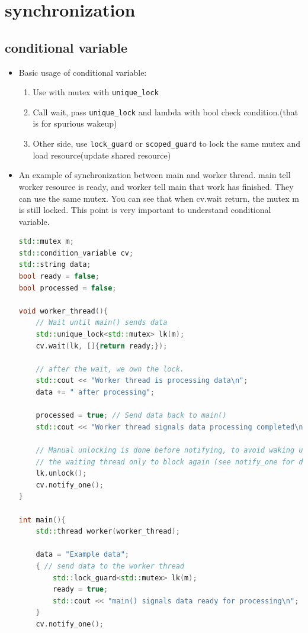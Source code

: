 \documentclass[a4paper,11pt,twoside]{book}
\begin{document}
\section{synchronization}
\subsection{conditional variable}
\begin{itemize}

	\item Basic usage of conditional variable:

\begin{enumerate}
	\item Use with mutex with \texttt{unique\_lock} 
	\item Call wait, pass \texttt{unique\_lock} and lambda with bool check condition.(that is for spurious wakeup)
	\item Other side, use \texttt{lock\_guard} or \texttt{scoped\_guard} to lock the same mutex and load resource(update shared resource)
\end{enumerate}

\item An example of synchronization between main and worker thread. main tell worker resource is ready, and worker tell main that work has finished. They can use the same mutex. You can see that when cv.wait return, the mutex m is still locked. This point is very important to understand conditional variable. 

\begin{lstlisting}[frame=single, language=c++]
std::mutex m;
std::condition_variable cv;
std::string data;
bool ready = false;
bool processed = false;

void worker_thread(){
	// Wait until main() sends data
	std::unique_lock<std::mutex> lk(m);
	cv.wait(lk, []{return ready;});
	
	// after the wait, we own the lock.
	std::cout << "Worker thread is processing data\n";
	data += " after processing";
	
	processed = true; // Send data back to main()
	std::cout << "Worker thread signals data processing completed\n";
	
	// Manual unlocking is done before notifying, to avoid waking up
	// the waiting thread only to block again (see notify_one for details)
	lk.unlock();
	cv.notify_one();
}

int main(){
	std::thread worker(worker_thread);
	
	data = "Example data";
	{ // send data to the worker thread
		std::lock_guard<std::mutex> lk(m);
		ready = true;
		std::cout << "main() signals data ready for processing\n";
	}
	cv.notify_one();
	

\end{lstlisting}
\end{itemize}
\end{document}
